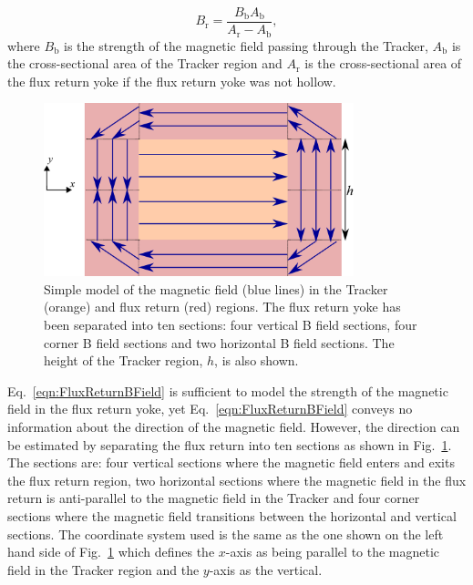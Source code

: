 \begin{equation}
  B_{\textrm{r}} = \frac{B_{\textrm{b}}A_{\textrm{b}}}{A_{\textrm{r}} - A_{\textrm{b}}},
  \label{eqn:FluxReturnBField}
\end{equation}
where $B_{\textrm{b}}$ is the strength of the magnetic field passing through the Tracker, $A_{\textrm{b}}$ is the cross-sectional area of the Tracker region and $A_{\textrm{r}}$ is the cross-sectional area of the flux return yoke if the flux return yoke was not hollow.
\newline
\newline
\begin{figure}
  \centering
  \includegraphics[width=9cm]{images/magnetic_field/BFieldDiagram}
  \caption{Simple model of the magnetic field (blue lines) in the Tracker (orange) and flux return (red) regions.  The flux return yoke has been separated into ten sections: four vertical B field sections, four corner B field sections and two horizontal B field sections.  The height of the Tracker region, $h$, is also shown.}
  \label{fig:BFieldDiagram}
\end{figure}
Eq.~\ref{eqn:FluxReturnBField} is sufficient to model the strength of the magnetic field in the flux return yoke, yet Eq.~\ref{eqn:FluxReturnBField} conveys no information about the direction of the magnetic field.  However, the direction can be estimated by separating the flux return into ten sections as shown in Fig.~\ref{fig:BFieldDiagram}.  The sections are: four vertical sections where the magnetic field enters and exits the flux return region, two horizontal sections where the magnetic field in the flux return is anti-parallel to the magnetic field in the Tracker and four corner sections where the magnetic field transitions between the horizontal and vertical sections.  The coordinate system used is the same as the one shown on the left hand side of Fig.~\ref{fig:BFieldDiagram} which defines the $x$-axis as being parallel to the magnetic field in the Tracker region and the $y$-axis as the vertical.  
